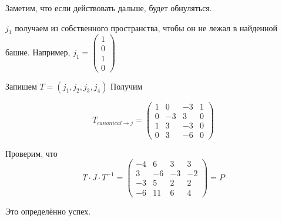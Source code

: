 \documentclass[12pt, a4paper]{article}
\begin{document}
    Заметим, что если действовать дальше, будет обнуляться.

    $j_1$ получаем из собственного пространства, чтобы он не лежал в найденной башне. Например, $j_1 = \begin{pmatrix}1\\0\\1\\0\end{pmatrix}$

    Запишем $T = (j_1, j_2, j_3, j_4)$ Получим

    \begin{equation}
        T_{canonical \to j} = \left(\begin{matrix}
            1 & 0 & -3 & 1 \\
            0 & -3 & 3 & 0 \\
            1 & 3 & -3 & 0 \\
            0 & 3 & -6 & 0
        \end{matrix}\right)
    \end{equation}

    Проверим, что 
    \begin{equation}
        T \cdot J \cdot T^{-1} = \left(\begin{matrix}
            -4 & 6 & 3 & 3 \\
            3 & -6 & -3 & -2 \\
            -3 & 5 & 2 & 2 \\
            -6 & 11 & 6 & 4
        \end{matrix}\right) = P
    \end{equation}

    Это определённо успех.
\end{document}
